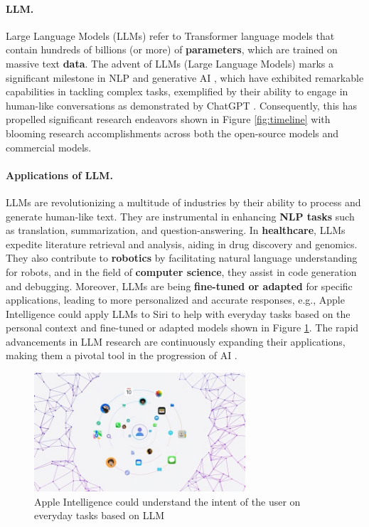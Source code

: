 \documentclass[lang=en]{sjtuarticle}
\begin{document}
\paragraph{LLM.}
Large Language Models (LLMs) refer to Transformer \cite{transformer}
language models that contain hundreds of billions (or
more) of \textbf{parameters}, which are trained on massive text
\textbf{data}. The advent of LLMs (Large Language Models) marks a significant milestone in NLP and generative AI \cite{sun2024trustllm}, which have exhibited remarkable capabilities in tackling complex tasks, exemplified by
their ability to engage in human-like conversations as demonstrated by ChatGPT \cite{ouyang2022training}. Consequently, this has propelled
significant research endeavors shown in Figure \ref{fig:timeline} with blooming research accomplishments across both the open-source models and commercial models.

\paragraph{Applications of LLM.}
LLMs are revolutionizing a multitude of industries by their ability to process and generate human-like text. They are instrumental in enhancing \textbf{NLP tasks} such as translation, summarization, and question-answering. In \textbf{healthcare}, LLMs expedite literature retrieval and analysis, aiding in drug discovery and genomics. They also contribute to \textbf{robotics} by facilitating natural language understanding for robots, and in the field of \textbf{computer science}, they assist in code generation and debugging. Moreover, LLMs are being \textbf{fine-tuned or adapted} for specific applications, leading to more personalized and accurate responses, e.g., Apple Intelligence \cite{apple} could apply LLMs to Siri to help with everyday tasks based on the personal context and fine-tuned or adapted models shown in Figure \ref{fig:appleIntent}.  The rapid advancements in LLM research are continuously expanding their applications, making them a pivotal tool in the progression of AI \cite{naveed2023comprehensive}.

\begin{figure}[h]
    \centering
    \includegraphics[width=0.7\textwidth]{appleContext.jpeg}
    \caption{Apple Intelligence could understand the intent of the user on everyday tasks based on LLM}
    \label{fig:appleIntent}
\end{figure}
\end{document}
